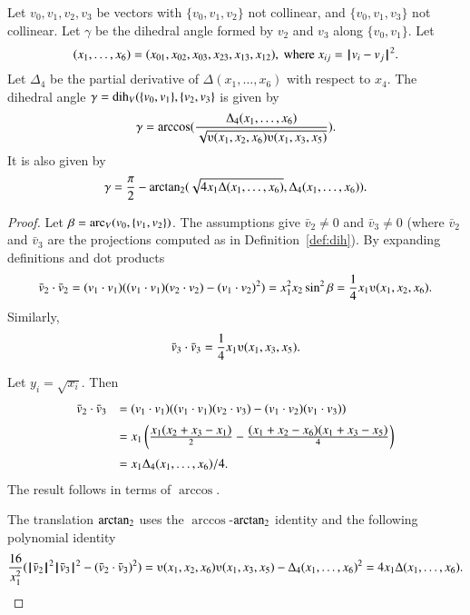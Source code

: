 \begin{lemma} \label{lemma:dihform}
Let $v_0,v_1,v_2,v_3$ 
be vectors with $\{v_0,v_1,v_2\}$ not collinear, 
and $\{v_0,v_1,v_3\}$ not
collinear. 
Let $\gamma$ be the dihedral angle formed
by $v_2$ and $v_3$ along $\{v_0,v_1\}$. Let
    $$(x_1,\ldots,x_6) = 
    (x_{01},x_{02},x_{03},x_{23},x_{13},x_{12}),
    \text{ where } x_{ij}={\hskip0.1em|\hskip-0.15em|\hskip0.1em}v_i - v_j{\hskip0.1em|\hskip-0.15em|\hskip0.1em}^2.$$
Let $\Delta_4$ be the partial derivative of $\Delta(x_1,\ldots,x_6)$ with
respect to $x_4$.
The dihedral angle $\gamma=\operatorname{dih}_V(\{v_0,v_1\},\{v_2,v_3\}$
is given by
    $$
    \gamma=\arccos(\frac{\Delta_4(x_1,\ldots,x_6)}{\sqrt{
    \ups(x_1,x_2,x_6)\ups(x_1,x_3,x_5)}}).
    $$
It is also given by
    $$
    \gamma=\frac{\pi}{2} - {\operatorname{arctan_2}}
     ({\sqrt{4 x_1 \Delta(x_1,\ldots,x_6)}},{\Delta_4(x_1,\ldots,x_6)}).
    $$
\end{lemma}


\begin{proof}
Let $\beta = \operatorname{arc}_V(v_0,\{v_1,v_2\})$.
The assumptions give $\bar v_2\ne 0$ and $\bar v_3 \ne 0$ (where $\bar v_2$ and
$\bar v_3$ are the projections computed as in Definition~\ref{def:dih}).  
    By expanding definitions and dot products
    $$
    \bar v_2\cdot \bar v_2 = (v_1\cdot v_1) ((v_1\cdot v_1)(v_2\cdot v_2) -
    (v_1\cdot v_2)^2) =  x_1^2 x_2 \sin^2 \beta = \frac{1}{4}
    x_1
    \ups(x_1,x_2,x_6).
    $$
    Similarly,
    $$\bar v_3 \cdot \bar v_3 = \frac{1}{4} x_1 \ups(x_1,x_3,x_5).$$

Let $y_i = \sqrt{x_i}$. Then
    $$\begin{array}{lll}
    \bar v_2\cdot \bar v_3 &= (v_1\cdot v_1)((v_1\cdot v_1)(v_2\cdot v_3) -
    (v_1\cdot v_2)(v_1\cdot v_3) ) \vspace{6pt} \\  &
    = x_1 \left(\frac{\displaystyle x_1 (x_2 + x_3 -
    x_1)}{2} - \frac{\displaystyle (x_1 + x_2 - x_6)(x_1 + x_3 -
    x_5)}{4} \right)\vspace{6pt}\\&
    = {x_1\Delta_4(x_1,\ldots,x_6)}/{4}.
    \end{array}
    $$
The result follows in terms of $\arccos$.

The translation ${\operatorname{arctan_2}}$ uses the $\arccos$-${\operatorname{arctan_2}}$ identity
and the following polynomial identity
    $$
    \frac{16}{x_1^2}(\normo{\bar v_2}^2 \normo{\bar v_3}^2 - (\bar v_2\cdot \bar v_3)^2) =
    \ups(x_1,x_2,x_6)\ups(x_1,x_3,x_5) - \Delta_4(x_1,\ldots,x_6)^2
    = 4 x_1 \Delta(x_1,\ldots,x_6).
    $$
\end{proof}






